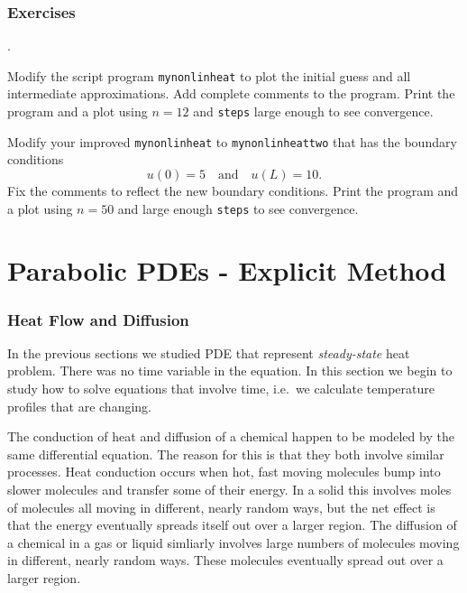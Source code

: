\newpage %


\subsection*{Exercises}
\begin{list}
{.}{}

\item Modify the script program \verb&mynonlinheat& to plot
    the initial guess and all intermediate approximations. Add
    complete comments to the program.  Print the program
    and a plot using $n = 12$ and \verb&steps& large enough to see
    convergence.
    
\item Modify your improved \verb&mynonlinheat& to
    \verb&mynonlinheattwo& that has the boundary conditions
    $$
    u(0) = 5 \quad\text{and}\quad u(L) = 10.
    $$
    Fix the comments to reflect the new boundary conditions. 
    Print the program and a plot using $n= 50$ and large enough
     \verb&steps& to see convergence.
\end{list}






\chapter{Parabolic PDEs - Explicit Method}


\subsection*{Heat Flow and Diffusion}

In the previous sections we studied PDE that represent {\em steady-state} heat problem.
There was no time variable in the equation. In this section we begin to study how
to solve equations that involve time, i.e.\ we calculate temperature profiles that are
changing.

The conduction of heat and diffusion of a chemical happen to be modeled
by the same differential equation. The reason for this is that
they both involve similar processes. Heat conduction occurs when
hot, fast moving molecules bump into slower molecules and transfer
some of their energy. In a solid this involves moles of molecules
all moving in different, nearly random ways, but the net effect
is that the energy
eventually spreads itself out over a larger region. The diffusion
of a chemical in a gas or liquid simliarly involves large numbers
of molecules moving in different, nearly random ways. These
molecules eventually spread out over a larger region.

